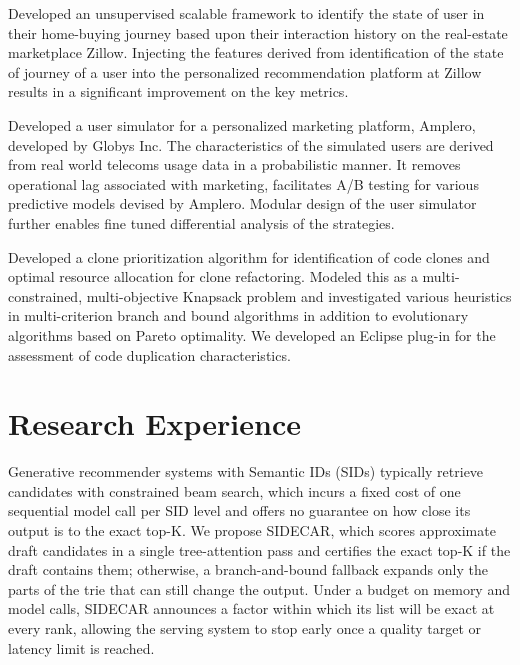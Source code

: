 \documentclass[10pt]{moderncv}
\begin{document}
{
    Developed an unsupervised scalable framework to identify the state of user in their home-buying journey based upon 
        their interaction history on the real-estate marketplace Zillow. 
    Injecting the features derived from identification of the state of journey of a user into the personalized 
        recommendation platform at Zillow results in a significant improvement on the key metrics.
}

{
    Developed a user simulator for a personalized marketing platform, Amplero, developed by Globys Inc. 
    The characteristics of the simulated users are derived from real world telecoms usage data in a probabilistic 
        manner. 
    It removes operational lag associated with marketing, facilitates A/B testing for various predictive models 
        devised by Amplero. 
    Modular design of the user simulator further enables fine tuned differential analysis of the strategies.
}

{
    Developed a clone prioritization algorithm for identification of code clones and optimal resource allocation for 
        clone refactoring. 
    Modeled this as a multi-constrained, multi-objective Knapsack problem and investigated various heuristics in 
        multi-criterion branch and bound algorithms in addition to evolutionary algorithms based on Pareto optimality. 
    We developed an Eclipse plug-in for the assessment of code duplication characteristics.
}

\section{Research Experience}
{
    Generative recommender systems with Semantic IDs (SIDs) typically retrieve candidates with constrained beam
        search, which incurs a fixed cost of one sequential model call per SID level and offers no guarantee on how
        close its output is to the exact top-K.
    We propose SIDECAR, which scores approximate draft candidates in a single tree-attention pass and certifies
        the exact top-K if the draft contains them; otherwise, a branch-and-bound fallback expands only the parts
        of the trie that can still change the output.
    Under a budget on memory and model calls, SIDECAR announces a factor within which its list will be exact at
        every rank, allowing the serving system to stop early once a quality target or latency limit is reached.
}
\end{document}
